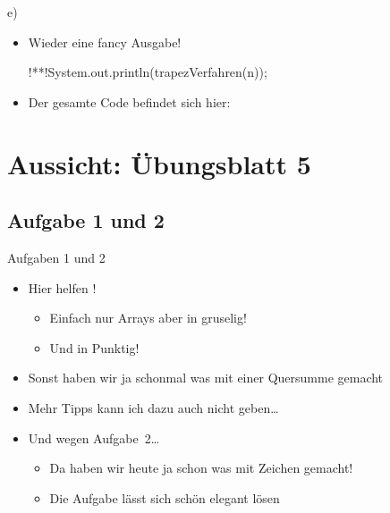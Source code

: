 \begin{frame}[fragile]{e)~}
\begin{itemize}[<+(1)->]
    \item Wieder eine fancy Ausgabe!
\begin{plainjava}
!**!System.out.println(trapezVerfahren(n));
\end{plainjava}
    \item Der gesamte Code befindet sich hier:~
\end{itemize}
\end{frame}

\iffull
{}
\section{Aussicht: Übungsblatt 5}
\subsection{Aufgabe 1 und 2}
\begin{frame}{Aufgaben 1\; und 2}
\begin{itemize}[<+(1)->]
    \itemsep9pt
    \item Hier helfen ! \begin{itemize}
        \item Einfach nur Arrays aber in gruselig!
        \item Und in Punktig! 
    \end{itemize}
    \item Sonst haben wir ja schonmal was mit einer Quersumme gemacht 
    \item Mehr Tipps kann ich dazu auch nicht geben\ldots
    \item Und wegen Aufgabe~2\ldots \begin{itemize}
        \item Da haben wir heute ja schon was mit Zeichen gemacht!
        \item Die Aufgabe lässt sich schön elegant lösen
    \end{itemize}
\end{itemize}
\end{frame}

